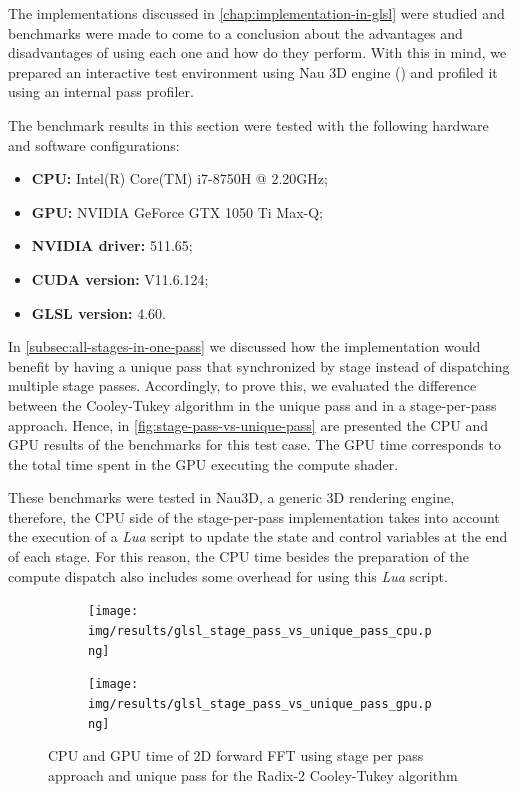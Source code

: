 \documentclass[
  oneside,
  11pt, a4paper,
  footinclude=true,
  headinclude=true,
  cleardoublepage=empty
]{scrbook}
\begin{document}
The implementations discussed in \autoref{chap:implementation-in-glsl} were studied and benchmarks were made to come to a conclusion about the advantages and disadvantages of using each one and how do they perform. With this in mind, we prepared an interactive test environment using Nau 3D engine (\cite{nau3d}) and profiled it using an internal pass profiler.

The benchmark results in this section were tested with the following hardware and software configurations:

\begin{itemize} \label{itm:benchmark-conditions}
    \item \textbf{CPU:} Intel(R) Core(TM) i7-8750H @ 2.20GHz;
    \item \textbf{GPU:} NVIDIA GeForce GTX 1050 Ti Max-Q;
    \item \textbf{NVIDIA driver:} 511.65;
    \item \textbf{CUDA version:}  V11.6.124;
    \item \textbf{GLSL version:}  4.60.
\end{itemize}

In \autoref{subsec:all-stages-in-one-pass} we discussed how the implementation would benefit by having a unique pass that synchronized by stage instead of dispatching multiple stage passes. Accordingly, to prove this, we evaluated the difference between the Cooley-Tukey algorithm in the unique pass and in a stage-per-pass approach. Hence, in \autoref{fig:stage-pass-vs-unique-pass} are presented the CPU and GPU results of the benchmarks for this test case. The GPU time corresponds to the total time spent in the GPU executing the compute shader.

These benchmarks were tested in Nau3D, a generic 3D rendering engine, therefore, the CPU side of the stage-per-pass implementation takes into account the execution of a \textit{Lua} script to update the state and control variables at the end of each stage. For this reason, the CPU time besides the preparation of the compute dispatch also includes some overhead for using this \textit{Lua} script.

\begin{figure}[H] 
    \begin{subfigure}{.5\textwidth}
        \centering
        \texttt{[image: img/results/glsl\_stage\_pass\_vs\_unique\_pass\_cpu.png]}
    \end{subfigure}
    \begin{subfigure}{.5\textwidth}
        \centering
        \texttt{[image: img/results/glsl\_stage\_pass\_vs\_unique\_pass\_gpu.png]}
    \end{subfigure}
    \caption{CPU and GPU time of 2D forward FFT using stage per pass approach and unique pass for the Radix-2 Cooley-Tukey algorithm}
    \label{fig:stage-pass-vs-unique-pass}
\end{figure}
\end{document}
